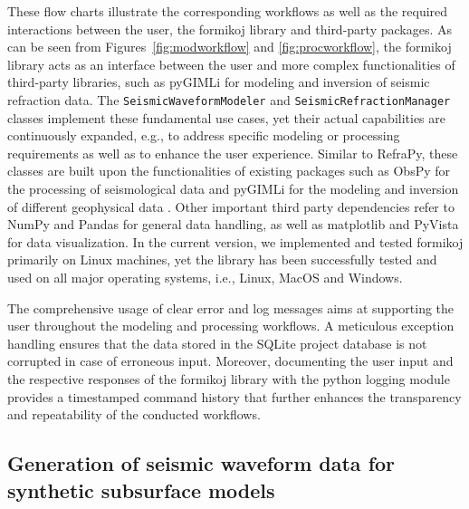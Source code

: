 \documentclass[a4paper,fleqn]{cas-sc}
\begin{document}
These flow charts illustrate the corresponding workflows as well as the required interactions between the user, the formikoj library and third-party packages. As can be seen from Figures~\ref{fig:modworkflow} and \ref{fig:procworkflow}, the formikoj library acts as an interface between the user and more complex functionalities of third-party libraries, such as pyGIMLi for modeling and inversion of seismic refraction data.
The \texttt{SeismicWaveformModeler} and \texttt{SeismicRefractionManager} classes implement these fundamental use cases, yet their actual capabilities are continuously expanded, e.g., to address specific modeling or processing requirements as well as to enhance the user experience.
Similar to RefraPy, these classes are built upon the functionalities of existing packages such as ObsPy for the processing of seismological data \citep[][]{beyreuther2010} and pyGIMLi for the modeling and inversion of different geophysical data \citep{ruecker2017}. Other important third party dependencies refer to NumPy \citep{harris2020} and Pandas \citep{mckinney2010} for general data handling, as well as matplotlib \citep{hunter2007} and PyVista \citep{sullivan2019} for data visualization. In the current version, we implemented and tested formikoj primarily on Linux machines, yet the library has been successfully tested and used on all major operating systems, i.e., Linux, MacOS and Windows.

The comprehensive usage of clear error and log messages aims at supporting the user throughout the modeling and processing workflows. A meticulous exception handling ensures that the data stored in the SQLite project database is not corrupted in case of erroneous input. Moreover, documenting the user input and the respective responses of the formikoj library with the python logging module provides a timestamped command history that further enhances the transparency and repeatability of the conducted workflows. 

\subsection{Generation of seismic waveform data for synthetic subsurface models}
\end{document}
